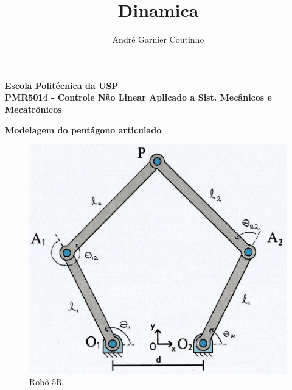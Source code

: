 \documentclass[12pt,a4paper]{article}
\title{Dinamica}
\author{André Garnier Coutinho}
\begin{document}
\begin{center}
\textbf{Escola Politécnica da USP\\
PMR5014 - Controle Não Linear Aplicado a Sist. Mecânicos e Mecatrônicos\\}
\end{center}

\begin{center}
\textbf{Modelagem do pentágono articulado}
\end{center}

\begin{figure}[h!]
	\centering
	\includegraphics[scale=0.3]{5Rscan.jpg}  
	\caption{Robô 5R}
	\label{fig:figura1}
\end{figure}

\end{document}
